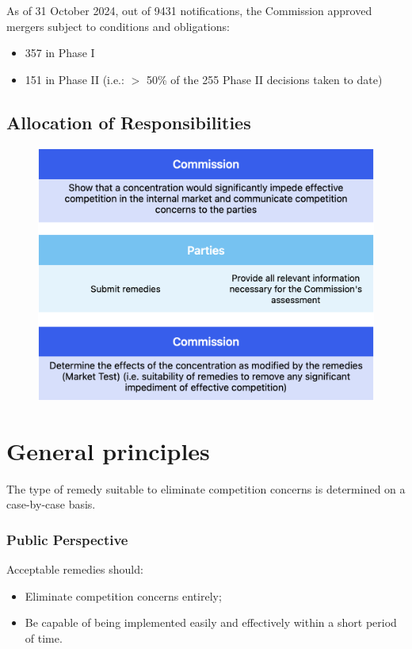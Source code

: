 As of 31 October 2024, out of 9431 notifications, the Commission approved mergers subject to conditions and obligations:
\begin{itemize}
    \item 357 in Phase I
    \item 151 in Phase II (i.e.: $>$ 50\% of the 255 Phase II decisions taken to date)
\end{itemize}

\newpage
\subsection*{Allocation of Responsibilities}

    \begin{figure}[ht]
        \centering
        \includegraphics[width=0.75\linewidth]{graphics/L16-1.png}
    \end{figure}

\section{General principles}

The type of remedy suitable to eliminate competition concerns is determined on a case-by-case basis.

        \subsubsection{Public Perspective}

            Acceptable remedies should:
            \begin{itemize}
                \item Eliminate competition concerns entirely;
                \item Be capable of being implemented easily and effectively
                within a short period of time.
            \end{itemize}
            
